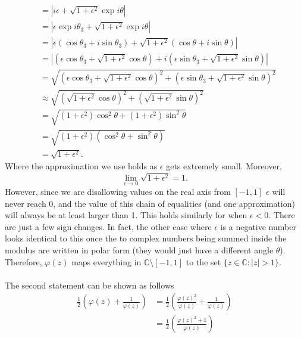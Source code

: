 \documentclass[10pt]{amsart}
\theoremstyle{nonumberplain}
\begin{document}
\begin{enumerate}[label={\bf {\arabic*}:}]
\begin{align*}
										  &= \left| i\epsilon + \sqrt{1 + \epsilon^2}\exp{i\theta}\right| \\
										  &= \left| \epsilon\exp i\theta_3 + \sqrt{1 + \epsilon^2}\exp{i\theta}\right| \\
										  &= \left| \epsilon\left(\cos\theta_3 + i\sin\theta_3\right) + \sqrt{1 + \epsilon^2}\left(\cos\theta + i\sin\theta\right)\right| \\
										  &= \left| \left(\epsilon\cos\theta_3 + \sqrt{1 + \epsilon^2}\cos\theta\right) + i\left(\epsilon\sin\theta_3 + \sqrt{1 + \epsilon^2}\sin\theta\right) \right| \\
										  &= \sqrt{\left(\epsilon\cos\theta_3 + \sqrt{1 + \epsilon^2}\cos\theta\right)^2 + \left(\epsilon\sin\theta_3 + \sqrt{1 + \epsilon^2}\sin\theta\right)^2 } \\
										  &\approx \sqrt{\left(\sqrt{1 + \epsilon^2}\cos\theta\right)^2 + \left(\sqrt{1 + \epsilon^2}\sin\theta\right)^2 } \\
										  &= \sqrt{(1 + \epsilon^2)\cos^2\theta + (1 +  \epsilon^2)\sin^2\theta } \\
										  &= \sqrt{(1 + \epsilon^2)\left(\cos^2\theta + \sin^2\theta\right) } \\
										  &= \sqrt{1 + \epsilon^2}.
\end{align*}
Where the approximation we use holds as $\epsilon$ gets extremely small.
Moreover, 
$$
\lim_{\epsilon\rightarrow 0} \sqrt{1 + \epsilon^2} = 1.
$$
However, since we are disallowing values on the real axis from $[-1, 1]$ $\epsilon$ will never reach 0, and the value of this chain of equalities (and one approximation) will always be at least larger than 1. This holds similarly for when $\epsilon < 0$. There are just a few sign changes. In fact, the other case where $\epsilon$ is a negative number looks identical to this once the to complex numbers being summed inside the modulus are written in polar form (they would just have a different angle $\theta$). Therefore, $\varphi(z)$ maps everything in $\mathbb C \setminus [-1, 1]$ to the set $\{z \in \mathbb C : |z| > 1\}$.
\\
\\
The second statement can be shown as follows \\
\begin{align*}
\frac{1}{2}\left(\varphi(z) + \frac{1}{\varphi(z)}\right) &= \frac{1}{2}\left(\frac{\varphi(z)^2}{\varphi(z)} + \frac{1}{\varphi(z)}\right) \\
   &= \frac{1}{2}\left(\frac{\varphi(z)^2 + 1}{\varphi(z)}\right) \\

\end{align*}
\end{enumerate}
\end{document}
